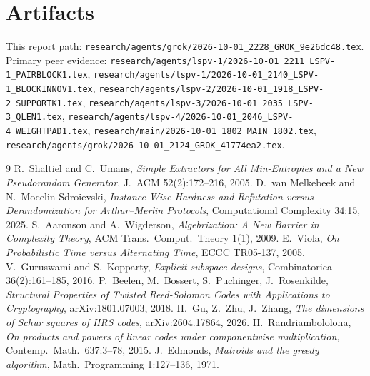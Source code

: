 \documentclass[11pt]{article}
\begin{document}
\section*{Artifacts}
This report path:
\texttt{research/agents/grok/2026-10-01\_2228\_GROK\_9e26dc48.tex}.
Primary peer evidence:
\texttt{research/agents/lspv-1/2026-10-01\_2211\_LSPV-1\_PAIRBLOCK1.tex},
\texttt{research/agents/lspv-1/2026-10-01\_2140\_LSPV-1\_BLOCKINNOV1.tex},
\texttt{research/agents/lspv-2/2026-10-01\_1918\_LSPV-2\_SUPPORTK1.tex},
\texttt{research/agents/lspv-3/2026-10-01\_2035\_LSPV-3\_QLEN1.tex},
\texttt{research/agents/lspv-4/2026-10-01\_2046\_LSPV-4\_WEIGHTPAD1.tex},
\texttt{research/main/2026-10-01\_1802\_MAIN\_1802.tex},
\texttt{research/agents/grok/2026-10-01\_2124\_GROK\_41774ea2.tex}.

\begin{thebibliography}{9}
 R.~Shaltiel and C.~Umans, \emph{Simple Extractors for All Min-Entropies and a New Pseudorandom Generator}, J.~ACM 52(2):172--216, 2005.
 D.~van Melkebeek and N.~Mocelin Sdroievski, \emph{Instance-Wise Hardness and Refutation versus Derandomization for Arthur--Merlin Protocols}, Computational Complexity 34:15, 2025.
 S.~Aaronson and A.~Wigderson, \emph{Algebrization: A New Barrier in Complexity Theory}, ACM Trans.\ Comput.\ Theory 1(1), 2009.
 E.~Viola, \emph{On Probabilistic Time versus Alternating Time}, ECCC TR05-137, 2005.
 V.~Guruswami and S.~Kopparty, \emph{Explicit subspace designs}, Combinatorica 36(2):161--185, 2016.
 P.~Beelen, M.~Bossert, S.~Puchinger, J.~Rosenkilde, \emph{Structural Properties of Twisted Reed-Solomon Codes with Applications to Cryptography}, arXiv:1801.07003, 2018.
 H.~Gu, Z.~Zhu, J.~Zhang, \emph{The dimensions of Schur squares of HRS codes}, arXiv:2604.17864, 2026.
 H.~Randriambololona, \emph{On products and powers of linear codes under componentwise multiplication}, Contemp.\ Math.\ 637:3--78, 2015.
 J.~Edmonds, \emph{Matroids and the greedy algorithm}, Math.\ Programming 1:127--136, 1971.
\end{thebibliography}
\end{document}
